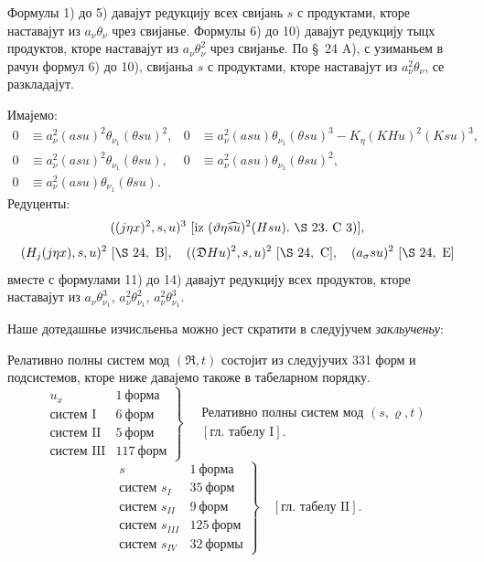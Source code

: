 ﻿\documentclass[11pt]{article}
\newcommand{\R}{\mathfrak R}
\newcommand{\D}{\mathfrak D}
\begin{document}
Формулы 1) до 5) давајут редукцију всех свијань $s$ с продуктами, кторе наставајут из $a_\nu\theta_\nu$ чрез свијанье. Формулы 6) до 10) давајут редукцију тыцх продуктов, кторе наставајут из $a_\nu\theta_\nu^2$ чрез свијанье. По \S\ 24 \mbox{A)}, с узиманьем в рачун формул 6) до 10), свијаньа $s$ с продуктами, кторе наставајут из $a_\nu^2\theta_\nu$, се разкладајут.

Имајемо:
\begin{align*}
0&\equiv a_\nu^2(asu)^2\theta_{\nu_1}(\theta su)^2,
&0&\equiv a_\nu^2(asu)\theta_{\nu_1}(\theta su)^3-K_\eta(KHu)^2(Ksu)^3,\\
0&\equiv a_\nu^2(asu)^2\theta_{\nu_1}(\theta su),
&0&\equiv a_\nu^2(asu)\theta_{\nu_1}(\theta su)^2,\\
0&\equiv a_\nu^2(asu)\theta_{\nu_1}(\theta su).
\end{align*}
Редуценты:
\[
 ((j\eta x)^2,s,u)^3\ [\hbox{iz }(\vartheta\eta\widehat{su})^2(Hsu).\ \S\ 23.\ \mbox{C\ 3})],
\]
\[
(H_j(j\eta x),s,u)^2\ [\S\ 24,\ \mbox{B}],
\quad ((\D Hu)^2,s,u)^2\ [\S\ 24,\ \mbox{C}],
\quad (a_\sigma su)^2\ [\S\ 24,\ \mbox{E}]
\]
вместе с формулами 11) до 14) давајут редукцију всех продуктов, кторе наставајут из $a_\nu\theta_{\nu_1}^3$, $a_\nu^2\theta_{\nu_1}^2$, $a_\nu^2\theta_{\nu_1}^3$.

Наше дотедашнье изчисльеньа можно јест скратити в следујучем \textit{закльученьу}:

Релативно полны систем мод $(\R,t)$ состојит из следујучих 331 форм и подсистемов, кторе ниже давајемо такоже в табеларном порядку.
\[
\left.
\begin{array}{lr}
u_x&1\ \text{форма}\\
\text{систем I}&6\ \text{форм}\\
\text{систем II}&5\ \text{форм}\\
\text{систем III}&117\ \text{форм}
\end{array}
\right\}
\quad
\begin{gathered}
\text{Релативно полны систем мод }(s,\varrho,t)\\
{}[\text{гл. табелу I}].
\end{gathered}
\]
\[
\left.
\begin{array}{lr}
s&1\ \text{форма}\\
\text{систем }s_I&35\ \text{форм}\\
\text{систем }s_{II}&9\ \text{форм}\\
\text{систем }s_{III}&125\ \text{форм}\\
\text{систем }s_{IV}&32\ \text{формы}
\end{array}
\right\}
\quad [\text{гл. табелу II}].
\]
\end{document}
